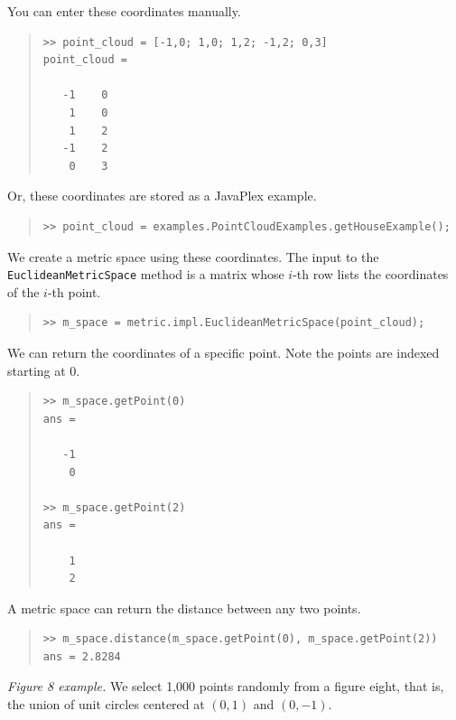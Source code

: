 \documentclass[amscd, amssymb, verbatim]{amsart}[12pt]
\theoremstyle{remark}
\theoremstyle{remark}
\theoremstyle{remark}
\begin{document}
You can enter these coordinates manually.

\begin{quote} \begin{verbatim}
>> point_cloud = [-1,0; 1,0; 1,2; -1,2; 0,3]
point_cloud =

   -1    0
    1    0
    1    2
   -1    2
    0    3
\end{verbatim} \end{quote}

Or, these coordinates are stored as a JavaPlex example.

\begin{quote} \begin{verbatim}
>> point_cloud = examples.PointCloudExamples.getHouseExample();
\end{verbatim} \end{quote}

We create a metric space using these coordinates. The input to the \texttt{EuclideanMetricSpace} method is a matrix whose $i$-th row lists the coordinates of the $i$-th point.

\begin{quote} \begin{verbatim}
>> m_space = metric.impl.EuclideanMetricSpace(point_cloud); 
\end{verbatim} \end{quote}

We can return the coordinates of a specific point. Note the points are indexed starting at 0.

\begin{quote} \begin{verbatim}
>> m_space.getPoint(0)
ans = 

   -1
    0
   
>> m_space.getPoint(2)
ans = 

    1
    2
\end{verbatim} \end{quote}

A metric space can return the distance between any two points.

\begin{quote} \begin{verbatim}
>> m_space.distance(m_space.getPoint(0), m_space.getPoint(2))
ans = 2.8284
\end{verbatim} \end{quote}

{\em Figure 8 example.} We select 1,000 points randomly from a figure eight, that is, the union of unit circles centered at $(0,1)$ and $(0,-1)$.
\end{document}
